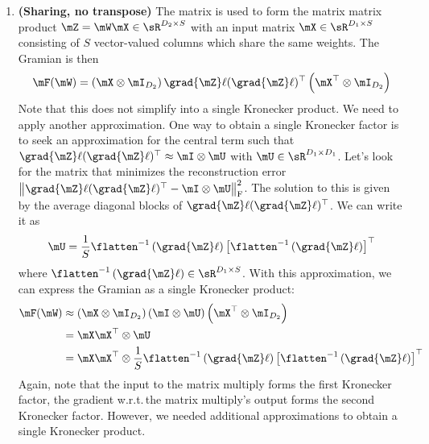 \begin{enumerate}
\item \textbf{(Sharing, no transpose)} The matrix is used to form the matrix matrix product $\mZ = \mW \mX \in \sR^{D_2 \times S}$ with an input matrix $\mX \in \sR^{D_1 \times S}$ consisting of $S$ vector-valued columns which share the same weights.
  The Gramian is then
  \begin{align*}
    \mF(\mW) =
    \left(
    \mX
    \otimes
    \mI_{D_2}
    \right)
    \grad{\mZ}\ell (\grad{\mZ}\ell)^{\top}
    \left(
    \mX^{\top}
    \otimes
    \mI_{D_2}
    \right)
  \end{align*}
  Note that this does not simplify into a single Kronecker product.
  We need to apply another approximation.
  One way to obtain a single Kronecker factor is to seek an approximation for the central term such that $\grad{\mZ}\ell (\grad{\mZ}\ell)^{\top} \approx \mI \otimes \mU$ with $\mU \in \sR^{D_1 \times D_1}$.
  Let's look for the matrix that minimizes the reconstruction error
  $\left\lVert \grad{\mZ}\ell (\grad{\mZ}\ell)^{\top} - \mI \otimes \mU
  \right\rVert_{\text{F}}^2$. The solution to this is given by the average
  diagonal blocks of $\grad{\mZ}\ell (\grad{\mZ}\ell)^{\top}$. We can write it
  as
  \begin{align}
    \mU
    =
    \frac{1}{S}
    \flatten^{-1}
    \left(
    \grad{\mZ}\ell
    \right)
    \left[
    \flatten^{-1}
    \left(
    \grad{\mZ}\ell
    \right)
    \right]^{\top}
  \end{align}
  where $\flatten^{-1} \left(\grad{\mZ}\ell \right) \in \sR^{D_1 \times S}$.
  With this approximation, we can express the Gramian as a single Kronecker product:
  \begin{align*}
    \begin{split}
      \mF(\mW)
      &\approx
        \left(
        \mX
        \otimes
        \mI_{D_2}
        \right)
        \left(
        \mI
        \otimes
        \mU
        \right)
        \left(
        \mX^{\top}
        \otimes
        \mI_{D_2}
        \right)
      \\
      &=
        \mX \mX^{\top}
        \otimes
        \mU
      \\
      &=
        \mX \mX^{\top}
        \otimes
        \frac{1}{S}
        \flatten^{-1}
        \left(
        \grad{\mZ}\ell
        \right)
        \left[
        \flatten^{-1}
        \left(
        \grad{\mZ}\ell
        \right)
        \right]^{\top}
    \end{split}
  \end{align*}
  Again, note that the input to the matrix multiply forms the first Kronecker factor, the gradient w.r.t.\,the matrix multiply's output forms the second Kronecker factor.
  However, we needed additional approximations to obtain a single Kronecker product.


\end{enumerate}
